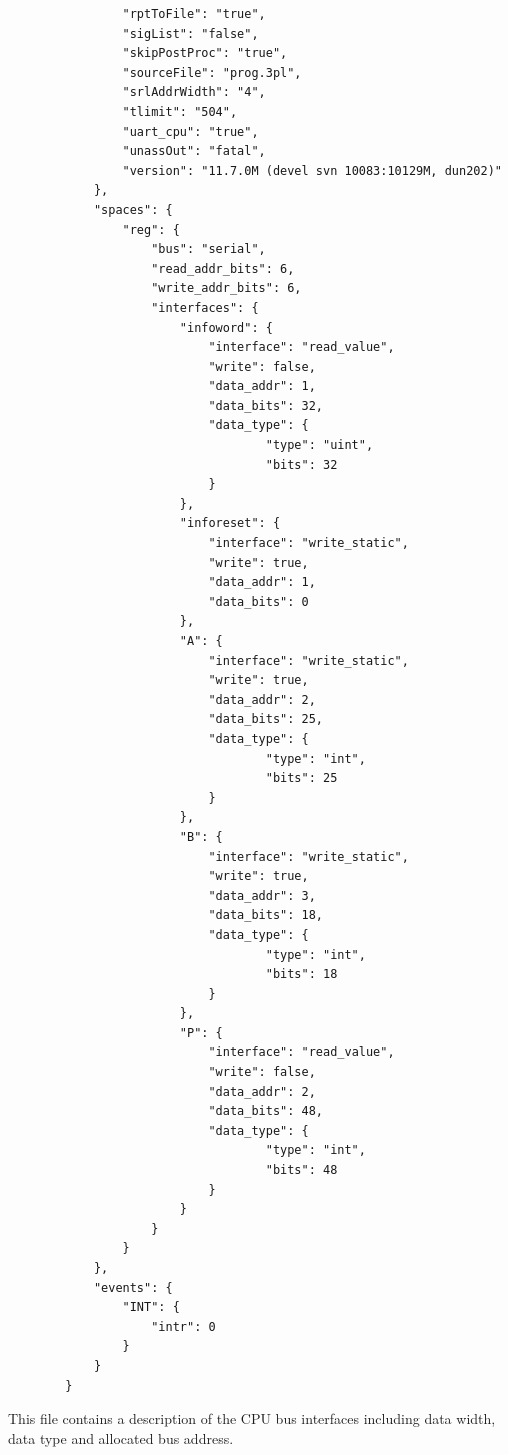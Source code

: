 \begin{verbatim}
                "rptToFile": "true",
                "sigList": "false",
                "skipPostProc": "true",
                "sourceFile": "prog.3pl",
                "srlAddrWidth": "4",
                "tlimit": "504",
                "uart_cpu": "true",
                "unassOut": "fatal",
                "version": "11.7.0M (devel svn 10083:10129M, dun202)"
            },
            "spaces": {
                "reg": {
                    "bus": "serial",
                    "read_addr_bits": 6,
                    "write_addr_bits": 6,
                    "interfaces": {
                        "infoword": {
                            "interface": "read_value",
                            "write": false,
                            "data_addr": 1,
                            "data_bits": 32,
                            "data_type": {
                                    "type": "uint",
                                    "bits": 32
                            }
                        },
                        "inforeset": {
                            "interface": "write_static",
                            "write": true,
                            "data_addr": 1,
                            "data_bits": 0
                        },
                        "A": {
                            "interface": "write_static",
                            "write": true,
                            "data_addr": 2,
                            "data_bits": 25,
                            "data_type": {
                                    "type": "int",
                                    "bits": 25
                            }
                        },
                        "B": {
                            "interface": "write_static",
                            "write": true,
                            "data_addr": 3,
                            "data_bits": 18,
                            "data_type": {
                                    "type": "int",
                                    "bits": 18
                            }
                        },
                        "P": {
                            "interface": "read_value",
                            "write": false,
                            "data_addr": 2,
                            "data_bits": 48,
                            "data_type": {
                                    "type": "int",
                                    "bits": 48
                            }
                        }
                    }
                }
            },
            "events": {
                "INT": {
                    "intr": 0
                }
            }
        }

    \end{verbatim}
    This file contains a description of the CPU bus interfaces including data
    width, data type and allocated bus address.
    
